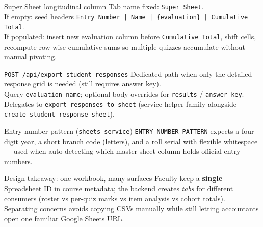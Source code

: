 \documentclass[aspectratio=169]{beamer}
\begin{document}
\begin{frame}{Super Sheet longitudinal column}
  \small
  Tab name fixed: \texttt{Super Sheet}.\\
  If empty: seed headers \texttt{Entry Number | Name | \{evaluation\} | Cumulative Total}.\\
  If populated: insert new evaluation column before \texttt{Cumulative Total}, shift cells, recompute row-wise cumulative sums so multiple quizzes accumulate without manual pivoting.
\end{frame}

\begin{frame}[fragile]{\texttt{POST /api/export-student-responses}}
  \small
  Dedicated path when only the detailed response grid is needed (still requires answer key).\\
  Query \texttt{evaluation\_name}; optional body overrides for \texttt{results} / \texttt{answer\_key}.\\
  Delegates to \texttt{export\_responses\_to\_sheet} (service helper family alongside \texttt{create\_student\_response\_sheet}).
\end{frame}

\begin{frame}{Entry-number pattern (\texttt{sheets\_service})}
  \small
  \texttt{ENTRY\_NUMBER\_PATTERN} expects a four-digit year, a short branch code (letters), and a roll serial with flexible whitespace --- used when auto-detecting which master-sheet column holds official entry numbers.
\end{frame}

\begin{frame}{Design takeaway: one workbook, many surfaces}
  \small
  Faculty keep a \textbf{single} Spreadsheet ID in course metadata; the backend creates \emph{tabs} for different consumers (roster vs per-quiz marks vs item analysis vs cohort totals).\\
  Separating concerns avoids copying CSVs manually while still letting accountants open one familiar Google Sheets URL.
\end{frame}
\end{document}
